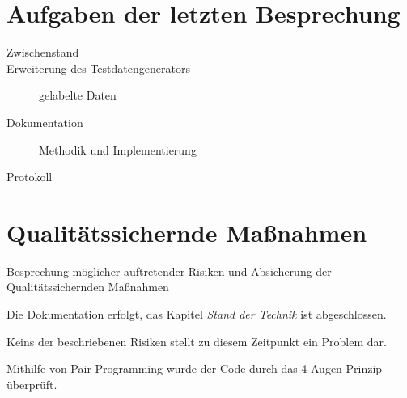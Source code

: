 
\newcommand{\Titel}{7. Protokoll}
\newcommand{\Teilnehmer}{Jonas Bürgel, Markus Reischl, Patrick Welter}
\newcommand{\DatumUndZeit}{07.03.2022 20:00-20:15}
\newcommand{\Ort}{Zoom Meeting}
\newcommand{\Thema}{Erweiterung GAN: Anpassungen zur Qualitätssteigerung}


\section{Aufgaben der letzten Besprechung}
\begin{description}
	\item[Zwischenstand]  \fullcheck
	\item[Erweiterung des Testdatengenerators] gelabelte Daten  \fullcheck
	\item[Dokumentation] Methodik und Implementierung  \halfcheck
	\item[Protokoll]  \fullcheck
\end{description}


\section{Qualitätssichernde Maßnahmen}
Besprechung möglicher auftretender Risiken und Absicherung der Qualitätssichernden Maßnahmen
\begin{description}[style=nextline]
	\item[Review und Dokumentation \hfill \fullcheck]
	Die Dokumentation erfolgt, das Kapitel \textit{Stand der Technik} ist abgeschlossen.
	
	\item[Risikoanalyse \hfill \fullcheck]
	Keins der beschriebenen Risiken stellt zu diesem Zeitpunkt ein Problem dar.
	
	\item[Pair-Programming \hfill \fullcheck]
	Mithilfe von Pair-Programming wurde der Code durch das 4-Augen-Prinzip überprüft.
	
	
\end{description}

